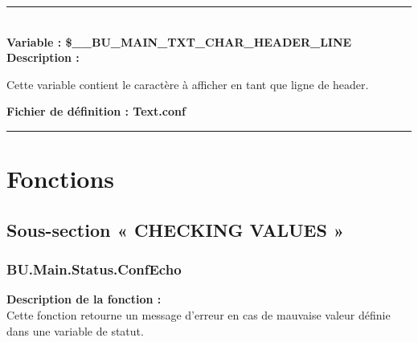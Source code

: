 \documentclass[a4paper,10pt]{article}
\begin{document}
    \color{vars}\par\noindent\rule{\textwidth}{0.4pt}\color{text}\\[1\baselineskip]

    \textbf{Variable : \color{vars}\$\_\_BU\_MAIN\_TXT\_CHAR\_HEADER\_LINE}\\[1\baselineskip]

    \textbf{Description :}

    \begin{justify}
        Cette variable contient le caractère à afficher en tant que ligne de header.
    \end{justify}

    \textbf{Fichier de définition : \color{path}Text.conf}\\[1\baselineskip]





    \color{sec1}\par\noindent\rule{\textwidth}{0.4pt}\color{text}

    \color{sec1}
    \section{Fonctions}\color{text}

    \color{sec2}
    \subsection{Sous-section « CHECKING VALUES »}

    \color{sec3}
    \subsubsection{BU.Main.Status.ConfEcho}\color{text}

    \begin{justify}
    \textbf{Description de la fonction :}\\[1\baselineskip]
        Cette fonction retourne un message d'erreur en cas de mauvaise valeur définie dans une variable de statut.
    \end{justify}
\end{document}
